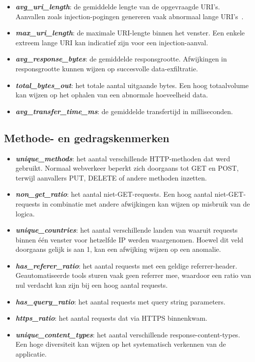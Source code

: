 \begin{itemize}
    \item \textbf{\textit{avg\_uri\_length}}: de gemiddelde lengte van de opgevraagde URI's. Aanvallen zoals injection-pogingen genereren vaak abnormaal lange URI's~\autocite{Chua2024}.
    \item \textbf{\textit{max\_uri\_length}}: de maximale URI-lengte binnen het venster. Een enkele extreem lange URI kan indicatief zijn voor een injection-aanval.
    \item \textbf{\textit{avg\_response\_bytes}}: de gemiddelde responsgrootte. Afwijkingen in responsgrootte kunnen wijzen op succesvolle data-exfiltratie.
    \item \textbf{\textit{total\_bytes\_out}}: het totale aantal uitgaande bytes. Een hoog totaalvolume kan wijzen op het ophalen van een abnormale hoeveelheid data.
    \item \textbf{\textit{avg\_transfer\_time\_ms}}: de gemiddelde transfertijd in milliseconden.
\end{itemize}

\subsection{Methode- en gedragskenmerken} 
\label{subsec:methode-gedragskenmerken}

\begin{itemize}
    \item \textbf{\textit{unique\_methods}}: het aantal verschillende HTTP-methoden dat werd gebruikt. Normaal webverkeer beperkt zich doorgaans tot GET en POST, terwijl aanvallers PUT, DELETE of andere methoden inzetten.
    \item \textbf{\textit{non\_get\_ratio}}: het aantal niet-GET-requests. Een hoog aantal niet-GET-requests in combinatie met andere afwijkingen kan wijzen op misbruik van de logica.
    \item \textbf{\textit{unique\_countries}}: het aantal verschillende landen van waaruit requests binnen één venster voor hetzelfde IP werden waargenomen. Hoewel dit veld doorgaans gelijk is aan 1, kan een afwijking wijzen op een anomalie.
    \item \textbf{\textit{has\_referer\_ratio}}: het aantal requests met een geldige referrer-header. Geautomatiseerde tools sturen vaak geen referrer mee, waardoor een ratio van nul verdacht kan zijn bij een hoog aantal requests.
    \item \textbf{\textit{has\_query\_ratio}}: het aantal requests met query string parameters.
    \item \textbf{\textit{https\_ratio}}: het aantal requests dat via HTTPS binnenkwam.
    \item \textbf{\textit{unique\_content\_types}}: het aantal verschillende response-content-types. Een hoge diversiteit kan wijzen op het systematisch verkennen van de applicatie.
\end{itemize}

